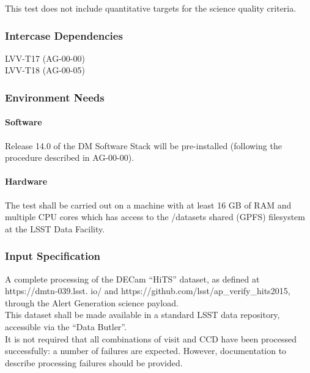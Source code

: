 This test does not include quantitative targets for the science quality
criteria.





\subsubsection{Intercase Dependencies}

LVV-T17 (AG-00-00)\\
LVV-T18 (AG-00-05)



\subsubsection{Environment Needs}

\paragraph{Software}

Release 14.0 of the DM Software Stack will be pre-installed (following
the procedure described in AG-00-00).



\paragraph{Hardware}

The test shall be carried out on a machine with at least 16 GB of RAM
and multiple CPU cores which has access to the /datasets shared (GPFS)
filesystem at the LSST Data Facility.



\subsubsection{Input Specification}

A complete processing of the DECam ``HiTS'' dataset, as defined at
https://dmtn-039.lsst. io/ and
https://github.com/lsst/ap\_verify\_hits2015, through the Alert
Generation science payload.\\
This dataset shall be made available in a standard LSST data repository,
accessible via the ``Data Butler''.\\
It is not required that all combinations of visit and CCD have been
processed successfully: a number of failures are expected. However,
documentation to describe processing failures should be provided.



